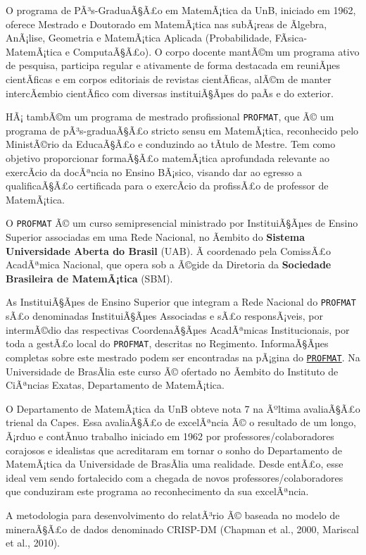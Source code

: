 \documentclass[]{article}
\begin{document}
O programa de PÃ³s-GraduaÃ§Ã£o em MatemÃ¡tica da UnB, iniciado em 1962,
oferece Mestrado e Doutorado em MatemÃ¡tica nas subÃ¡reas de Ãlgebra,
AnÃ¡lise, Geometria e MatemÃ¡tica Aplicada (Probabilidade,
FÃ­sica-MatemÃ¡tica e ComputaÃ§Ã£o). O corpo docente mantÃ©m um programa
ativo de pesquisa, participa regular e ativamente de forma destacada em
reuniÃµes cientÃ­ficas e em corpos editoriais de revistas cientÃ­ficas,
alÃ©m de manter intercÃ¢mbio cientÃ­fico com diversas instituiÃ§Ãµes do
paÃ­s e do exterior.

HÃ¡ tambÃ©m um programa de mestrado profissional \texttt{PROFMAT}, que
Ã© um programa de pÃ³s-graduaÃ§Ã£o stricto sensu em MatemÃ¡tica,
reconhecido pelo MinistÃ©rio da EducaÃ§Ã£o e conduzindo ao tÃ­tulo de
Mestre. Tem como objetivo proporcionar formaÃ§Ã£o matemÃ¡tica
aprofundada relevante ao exercÃ­cio da docÃªncia no Ensino BÃ¡sico,
visando dar ao egresso a qualificaÃ§Ã£o certificada para o exercÃ­cio da
profissÃ£o de professor de MatemÃ¡tica.

O \texttt{PROFMAT} Ã© um curso semipresencial ministrado por
InstituiÃ§Ãµes de Ensino Superior associadas em uma Rede Nacional, no
Ã¢mbito do \textbf{Sistema Universidade Aberta do Brasil} (UAB). Ã
coordenado pela ComissÃ£o AcadÃªmica Nacional, que opera sob a Ã©gide da
Diretoria da \textbf{Sociedade Brasileira de MatemÃ¡tica} (SBM).

As InstituiÃ§Ãµes de Ensino Superior que integram a Rede Nacional do
\texttt{PROFMAT} sÃ£o denominadas InstituiÃ§Ãµes Associadas e sÃ£o
responsÃ¡veis, por intermÃ©dio das respectivas CoordenaÃ§Ãµes
AcadÃªmicas Institucionais, por toda a gestÃ£o local do
\texttt{PROFMAT}, descritas no Regimento. InformaÃ§Ãµes completas sobre
este mestrado podem ser encontradas na pÃ¡gina do
\href{http://www.profmat-sbm.org.br}{\texttt{PROFMAT}}. Na Universidade
de BrasÃ­lia este curso Ã© ofertado no Ã¢mbito do Instituto de CiÃªncias
Exatas, Departamento de MatemÃ¡tica.

O Departamento de MatemÃ¡tica da UnB obteve nota 7 na Ãºltima
avaliaÃ§Ã£o trienal da Capes. Essa avaliaÃ§Ã£o de excelÃªncia Ã© o
resultado de um longo, Ã¡rduo e contÃ­nuo trabalho iniciado em 1962 por
professores/colaboradores corajosos e idealistas que acreditaram em
tornar o sonho do Departamento de MatemÃ¡tica da Universidade de
BrasÃ­lia uma realidade. Desde entÃ£o, esse ideal vem sendo fortalecido
com a chegada de novos professores/colaboradores que conduziram este
programa ao reconhecimento da sua excelÃªncia.

A metodologia para desenvolvimento do relatÃ³rio Ã© baseada no modelo de
mineraÃ§Ã£o de dados denominado CRISP-DM (Chapman et al., 2000, Mariscal
et al., 2010).
\end{document}
